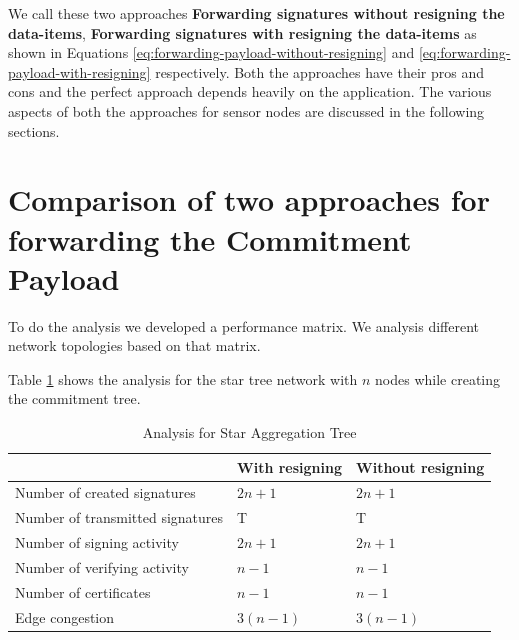 	We call these two approaches \textbf{Forwarding signatures without resigning the data-items}, \textbf{Forwarding signatures with resigning the data-items} as shown in Equations \ref{eq:forwarding-payload-without-resigning} and \ref{eq:forwarding-payload-with-resigning} respectively.
	Both the approaches have their pros and cons and the perfect approach depends heavily on the application.
	The various aspects of both the approaches for sensor nodes are discussed in the following sections.

	\section{Comparison of two approaches for forwarding the Commitment Payload}
		To do the analysis we developed a performance matrix. 
		We analysis different network topologies based on that matrix.

		Table \ref{table:Analysis table for Star Aggregation Tree} shows the analysis for the star tree network with $n$ nodes while creating the commitment tree.
		\begin{table}[!htb]	
			\begin{center}
				\begin{tabular}{ |l| l| l| }
			    \hline
			    & With resigning & Without resigning \\
			    \hline
			    Number of created signatures & $2n + 1$ & $2n + 1$ \\	
			    \hline
			    Number of transmitted signatures & T & T\\
			    \hline
			    Number of signing activity & $2n + 1$ & $2n + 1$ \\
			    \hline
			    Number of verifying activity & $n - 1$ & $n - 1$ \\
			    \hline
			    Number of certificates & $n - 1$ & $n - 1$ \\
			    \hline
			    Edge congestion & $3(n - 1)$ & $3(n - 1)$\\
			    \hline
				\end{tabular}
			\end{center}
	  	\caption{Analysis for Star Aggregation Tree}
		  \label{table:Analysis table for Star Aggregation Tree}
	  \end{table}

